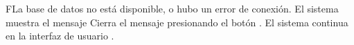 
\begin{UCtrayectoriaA}{F}{La base de datos no está disponible, o hubo un error de conexión.}
	\UCpaso El sistema muestra el mensaje 
	\UCpaso[\UCactor] Cierra el mensaje presionando el botón .
	\UCpaso  El sistema continua en la interfaz de usuario .
\end{UCtrayectoriaA}







